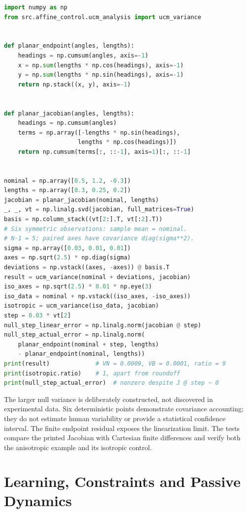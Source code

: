\begin{lstlisting}[language=Python, caption={Manufactured Reaching Variance and Finite Task Error}]
import numpy as np
from src.affine_control.ucm_analysis import ucm_variance


def planar_endpoint(angles, lengths):
    headings = np.cumsum(angles, axis=-1)
    x = np.sum(lengths * np.cos(headings), axis=-1)
    y = np.sum(lengths * np.sin(headings), axis=-1)
    return np.stack((x, y), axis=-1)


def planar_jacobian(angles, lengths):
    headings = np.cumsum(angles)
    terms = np.array([-lengths * np.sin(headings),
                     lengths * np.cos(headings)])
    return np.cumsum(terms[:, ::-1], axis=1)[:, ::-1]


nominal = np.array([0.5, 1.2, -0.3])
lengths = np.array([0.3, 0.25, 0.2])
jacobian = planar_jacobian(nominal, lengths)
_, _, vt = np.linalg.svd(jacobian, full_matrices=True)
basis = np.column_stack((vt[2:].T, vt[:2].T))
# Six symmetric observations: sample mean = nominal.
# N-1 = 5; paired axes have covariance diag(sigma**2).
sigma = np.array([0.03, 0.01, 0.01])
axes = np.sqrt(2.5) * np.diag(sigma)
deviations = np.vstack((axes, -axes)) @ basis.T
result = ucm_variance(nominal + deviations, jacobian)
iso_axes = np.sqrt(2.5) * 0.01 * np.eye(3)
iso_data = nominal + np.vstack((iso_axes, -iso_axes))
isotropic = ucm_variance(iso_data, jacobian)
step = 0.03 * vt[2]
null_step_linear_error = np.linalg.norm(jacobian @ step)
null_step_actual_error = np.linalg.norm(
    planar_endpoint(nominal + step, lengths)
    - planar_endpoint(nominal, lengths))
print(result)             # VN = 0.0009, VB = 0.0001, ratio = 9
print(isotropic.ratio)    # 1, apart from roundoff
print(null_step_actual_error)  # nonzero despite J @ step ~ 0
\end{lstlisting}

The larger null variance is deliberately constructed, not discovered in
experimental data. Six deterministic points demonstrate covariance accounting;
they do not estimate human variability or provide a statistical confidence
interval. The finite endpoint residual exposes the linearization limit.
The tests compare the printed Jacobian with Cartesian finite differences and
verify both the anisotropic example and its isotropic control.

\section{Learning, Constraints and Passive Dynamics}

